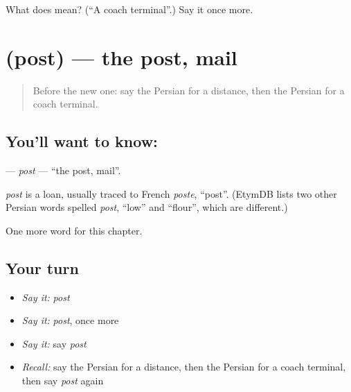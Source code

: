 \begin{tcolorbox}[breakable,colback=teal!4,colframe=teal!35!black,title={Before you move on}]
What does  mean? (\textquotedblleft{}A coach terminal\textquotedblright{}.) Say it once more.
\end{tcolorbox}
\section[\texorpdfstring{\fa{پست} (post)}{پست (post)}]{ (post) — the post, mail}

\label{lesson:FA-C194-post}



\begin{quote}
Before the new one: say the Persian for a distance, then the Persian for a coach terminal.
\end{quote}

\subsection*{You'll want to know: }
\textbf{} — \emph{post} — \textquotedblleft{}the post, mail\textquotedblright{}.

\begin{cousinweb}
\emph{post} is a loan, usually traced to French \emph{poste}, \textquotedblleft{}post\textquotedblright{}. (EtymDB lists two other Persian words spelled \emph{post}, \textquotedblleft{}low\textquotedblright{} and \textquotedblleft{}flour\textquotedblright{}, which are different.)
\end{cousinweb}

\begin{grammarlens}[title={What you've built}]
One more word for this chapter.
\end{grammarlens}

\subsection*{Your turn}
\begin{itemize}
\raggedright
  \item \emph{Say it:} \emph{post}
  \item \emph{Say it:} \emph{post}, once more
  \item \emph{Say it:} say \emph{post}
  \item \emph{Recall:} say the Persian for a distance, then the Persian for a coach terminal, then say \emph{post} again
\end{itemize}

